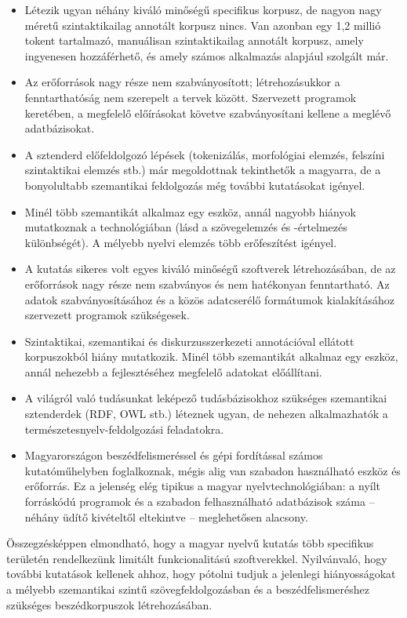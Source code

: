 \begin{multicols}{2}
\begin{itemize}
\item Létezik ugyan néhány kiváló mi\-nő\-sé\-gű specifikus korpusz, de nagyon nagy méretű szintaktikailag annotált korpusz nincs. Van  azonban egy 1,2 millió tokent tartalmazó, manuálisan szintaktikailag annotált korpusz, amely ingyenesen hozzáférhető, és amely számos alkalmazás alapjául szolgált már.
\item Az erőforrások nagy része nem szabványosított; létrehozásukkor a fenn\-tart\-ha\-tó\-ság nem szerepelt a tervek között. Szervezett programok keretében, a megfelelő előírásokat követve szabványosítani kellene a meglévő adatbázisokat. 
\item A sztenderd előfeldolgozó lépések (tokenizálás, morfológiai elemzés, felszíni szintaktikai elemzés stb.) már megoldottnak tekinthetők a magyarra, de a bonyolultabb szemantikai feldolgozás még további kutatásokat igényel.
\item Minél több szemantikát alkalmaz egy eszköz, annál nagyobb hiányok mutatkoznak a technológiában (lásd a szövegelemzés és -értelmezés kü\-lönb\-sé\-gét). A mélyebb nyelvi elem\-zés több erőfeszítést igényel.
\item A kutatás sikeres volt egyes kiváló minőségű szoftverek létrehozásában, de az erőforrások nagy része nem szabványos és nem hatékonyan fenn\-tart\-ha\-tó. Az adatok szab\-vá\-nyo\-sí\-tá\-sá\-hoz és a közös adatcserélő formátumok kialakításához szervezett programok szükségesek.
\item Szintaktikai, szemantikai és dis\-kur\-zus\-szer\-ke\-ze\-ti annotációval ellátott korpuszokból hiány mutatkozik. Minél több szemantikát alkalmaz egy eszköz, annál nehezebb a fej\-lesz\-té\-sé\-hez megfelelő adatokat előállítani. 
\item A világról való tudásunkat leképező tudásbázisokhoz szükséges szemantikai sztenderdek (RDF, OWL stb.) léteznek ugyan, de nehezen al\-kal\-maz\-ha\-tók a ter\-mé\-sze\-tes\-nyelv-fel\-dol\-go\-zá\-si feladatokra. 
\item Magyarországon beszédfelismeréssel és gépi fordítással számos kutatóműhelyben foglalkoznak, mégis alig van szabadon használható esz\-köz és erőforrás. Ez a jelenség elég tipikus a magyar nyelvtechnológiában: a nyílt forráskódú prog\-ra\-mok és a szabadon felhasználható adatbázisok száma -- néhány üdítő kivételtől eltekintve -- meglehetősen alacsony. 
\end{itemize}

Összegzésképpen elmondható, hogy a ma\-gyar nyelvű kutatás több specifikus te\-rü\-le\-tén rendelkezünk limitált funkcionalitású szoftverekkel. Nyilvánvaló, hogy további kutatások kellenek ahhoz, hogy pótolni tudjuk a jelenlegi hiányosságokat a mélyebb szemantikai szintű szövegfeldolgozásban és a beszédfelismeréshez szükséges beszédkorpuszok létrehozásában.


\end{multicols}
